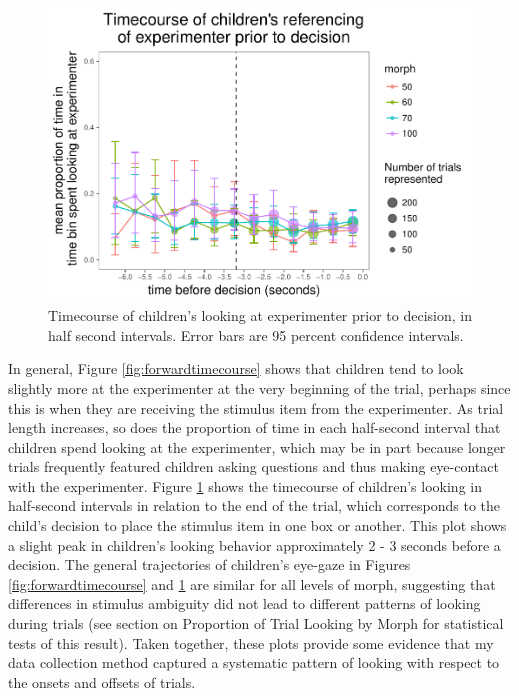 \documentclass[floatsintext,man]{apa6}
\theoremstyle{definition}
\theoremstyle{definition}
\theoremstyle{definition}
\theoremstyle{remark}
\begin{document}
\begin{figure}
\centering
\includegraphics{soc_ref_category_paper_files/figure-latex/reversetimecourse-1.pdf}
\caption{\label{fig:reversetimecourse}Timecourse of children's looking at
experimenter prior to decision, in half second intervals. Error bars are
95 percent confidence intervals.}
\end{figure}

In general, Figure \ref{fig:forwardtimecourse} shows that children tend
to look slightly more at the experimenter at the very beginning of the
trial, perhaps since this is when they are receiving the stimulus item
from the experimenter. As trial length increases, so does the proportion
of time in each half-second interval that children spend looking at the
experimenter, which may be in part because longer trials frequently
featured children asking questions and thus making eye-contact with the
experimenter. Figure \ref{fig:reversetimecourse} shows the timecourse of
children's looking in half-second intervals in relation to the end of
the trial, which corresponds to the child's decision to place the
stimulus item in one box or another. This plot shows a slight peak in
children's looking behavior approximately 2 - 3 seconds before a
decision. The general trajectories of children's eye-gaze in Figures
\ref{fig:forwardtimecourse} and \ref{fig:reversetimecourse} are similar
for all levels of morph, suggesting that differences in stimulus
ambiguity did not lead to different patterns of looking during trials
(see section on Proportion of Trial Looking by Morph for statistical
tests of this result). Taken together, these plots provide some evidence
that my data collection method captured a systematic pattern of looking
with respect to the onsets and offsets of trials.
\end{document}
